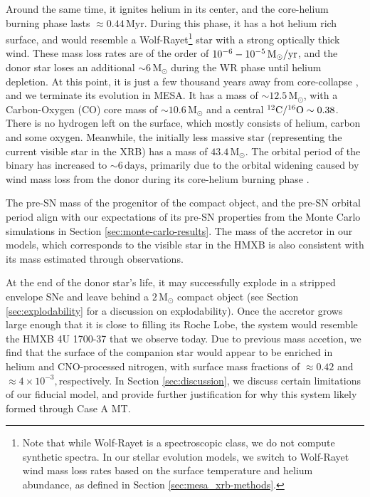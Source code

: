\documentclass[linenumbers,trackchanges,twocolumn]{aastex701}
\newcommand{\Mdot}{\mathrm{M}_{\odot}}
\begin{document}
Around the same time, it ignites helium in its center, and the core-helium burning phase lasts $\approx 0.44\,\mathrm{Myr}$. During this phase, it has a hot helium rich surface, and would resemble a Wolf-Rayet\footnote{Note that while Wolf-Rayet is a spectroscopic class, we do not compute synthetic spectra. In our stellar evolution models, we switch to Wolf-Rayet wind mass loss rates based on the surface temperature and helium abundance, as defined in Section \ref{sec:mesa_xrb-methods}.} star \citep[e.g.,][]{2020A&A...634A..79S} with a strong optically thick wind. These mass loss rates are of the order of $10^{-6} - 10^{-5} \,\Mdot/\rm yr$, and the donor star loses an additional $\sim 6\,\Mdot$ during the WR phase until helium depletion. At this point, it is just a few thousand years away from core-collapse \citep[e.g.,][]{1978ApJ...225.1021W}, and we terminate its evolution in \textsc{MESA}. It has a mass of $\sim 12.5\,\Mdot$, with a Carbon-Oxygen (CO) core mass of $\sim 10.6\,\Mdot$ and a central $\rm ^{12}C/^{16}O \sim 0.38$. There is no hydrogen left on the surface, which mostly consists of helium, carbon and some oxygen. Meanwhile, the initially less massive star (representing the current visible star in the XRB) has a mass of $43.4\,\Mdot$. The orbital period of the binary has increased to $\sim 6\,\mathrm{days}$, primarily due to the orbital widening caused by wind mass loss from the donor during its core-helium burning phase \citep{2000A&A...360..227N}.

The pre-SN mass of the progenitor of the compact object, and the pre-SN orbital period align with our expectations of its pre-SN properties from the Monte Carlo simulations in Section \ref{sec:monte-carlo-results}. The mass of the accretor in our models, which corresponds to the visible star in the HMXB is also consistent with its mass estimated through observations.

At the end of the donor star's life, it may successfully explode in a stripped envelope SNe and leave behind a $2 \, \Mdot$ compact object (see Section \ref{sec:explodability} for a discussion on explodability). Once the accretor grows large enough that it is close to filling its Roche Lobe, the system would resemble the HMXB 4U 1700-37 that we observe today. Due to previous mass accetion, we find that the surface of the companion star would appear to be enriched in helium and CNO-processed nitrogen, with surface mass fractions of $\approx 0.42$ and $\approx 4\times 10^{-3}, $respectively. In Section \ref{sec:discussion}, we discuss certain limitations of our fiducial model, and provide further justification for why this system likely formed through Case A MT.
\end{document}
